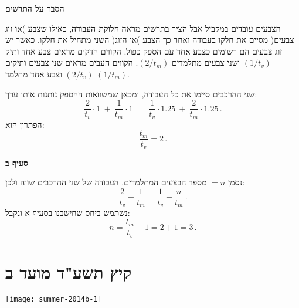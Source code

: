 \smallskip

\noindent\textbf{הסבר על התרשים}

הצבעים עובדים במקביל אבל הציר בתרשים מראה
\textbf{חלוקת העבודה},
כאילו שצבע )או זוג צבעים( מסיים את חלקו בעבודה ואחר כך הצבע )או הזוג( השני מתחיל את חלקו. כאשר יש זוג צבעים הם רשומים כצבע אחד עם הספק כפול. הקווים הדקים מראים צבע אחד ותיק 
$(1/t_v)$
ושני צבעים מתלמדים
$(2/t_m)$.
הקווים העבים מראים שני צבעים ותיקים
$(2/t_v)$
וצבע אחד מתלמד
$(1/t_m)$.

\np

שני ההרכבים סיימו את כל העבודה, ומכאן שמשוואות ההספק נותנות אותו ערך:
\[
\frac{2}{t_v}\cdot 1 \:+\: \frac{1}{t_m}\cdot 1 \;=\; \frac{1}{t_v}\cdot 1.25 \:+\: \frac{2}{t_m} \cdot 1.25 \,.
\]
הפתרון הוא:
\[
\frac{t_m}{t_v}=2\,.
\]

\textbf{סעיף ב}

\begin{center}
\end{center}

נסמן
$=n$
מספר הבצעים המתלמדים. העבודה של שני ההרכבים שווה ולכן:
\[
\frac{2}{t_v} + \frac{1}{t_m} = \frac{1}{t_v} + \frac{n}{t_m}\,.
\]
נשתמש ביחס שחישבנו בסעיף א ונקבל:
\[
n = \frac{t_m}{t_v}+1 = 2+1=3\,.
\]


\np

\section{קיץ תשע"ד מועד ב}

\begin{center}
\texttt{[image: summer-2014b-1]}
\end{center}

